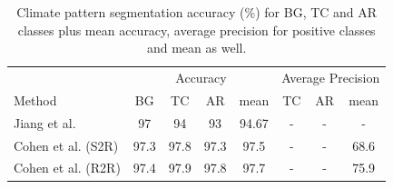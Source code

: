 \documentclass[11pt]{report}
\begin{document}
\begin{table}
\begin{tabular}{l|c c c c c c c}
        \multicolumn{1}{l}{} & \multicolumn{4}{c}{Accuracy} & \multicolumn{3}{c}{Average Precision}\\
        \cmidrule(lr){2-5}\cmidrule(lr){6-8}
        \multicolumn{1}{l}{Method} & BG & TC & AR & mean & TC & AR & mean \\ \hline
        Jiang et al. & 97 & 94 & 93 & 94.67 & - & - & -\\
        Cohen et al. (S2R) & 97.3 & 97.8 & 97.3 & 97.5 & - & -& 68.6\\
        Cohen et al. (R2R) & 97.4 & 97.9 & 97.8 & 97.7 & - & -& 75.9\\ \hline
    \end{tabular}
    \caption{Climate pattern segmentation accuracy (\%) for BG, TC
and AR classes plus mean accuracy, average precision for positive classes and mean as well.}
\end{table}

\end{document}
